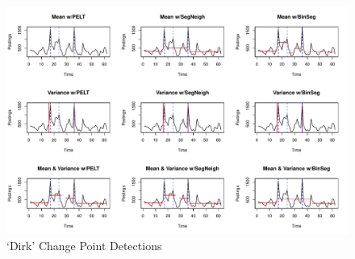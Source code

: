 \documentclass[../main.tex]{subfiles}
\begin{document}
\begin{figure}[h]
    \includegraphics[width=\textwidth]{figures/uwvresults}
    \caption{`Dirk' Change Point Detections}
    \label{fig:uwv}
\end{figure}
\end{document}
